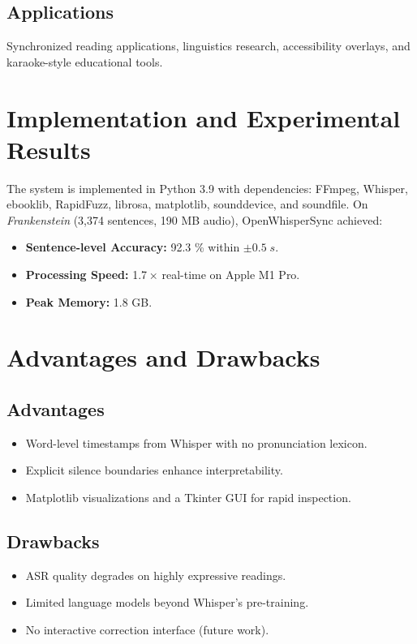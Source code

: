 \documentclass[12pt]{article}
\begin{document}
\subsection{Applications}
Synchronized reading applications, linguistics research, accessibility
overlays, and karaoke-style educational tools.

\section{Implementation and Experimental Results}
The system is implemented in Python 3.9 with dependencies: FFmpeg, Whisper,
ebooklib, RapidFuzz, librosa, matplotlib, sounddevice, and soundfile.
On \emph{Frankenstein} (3,374 sentences, 190 MB audio),
OpenWhisperSync achieved:
\begin{itemize}
  \item \textbf{Sentence-level Accuracy:} 92.3 \% within \(\pm0.5\;s\).
  \item \textbf{Processing Speed:} 1.7 × real-time on Apple M1 Pro.
  \item \textbf{Peak Memory:} 1.8 GB.
\end{itemize}

\section{Advantages and Drawbacks}
\subsection{Advantages}
\begin{itemize}
  \item Word-level timestamps from Whisper with no pronunciation lexicon.
  \item Explicit silence boundaries enhance interpretability.
  \item Matplotlib visualizations and a Tkinter GUI for rapid inspection.
\end{itemize}
\subsection{Drawbacks}
\begin{itemize}
  \item ASR quality degrades on highly expressive readings.
  \item Limited language models beyond Whisper’s pre-training.
  \item No interactive correction interface (future work).
\end{itemize}
\end{document}
